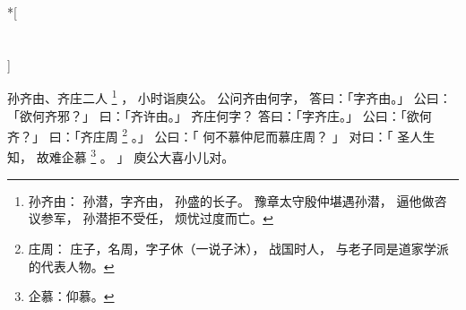 
\switchcolumn[0]*[\section{}]

孙齐由、齐庄二人%
\footnote{%
    孙齐由：
        孙潜，字齐由，
        孙盛的长子。
        豫章太守殷仲堪遇孙潜，
        逼他做咨议参军，
        孙潜拒不受任，
        烦忧过度而亡。
}%
，
小时诣庾公。
公问齐由何字，
答曰：「字齐由。」
公曰：「欲何齐邪？」
曰：「齐许由。」
齐庄何字？
答曰：「字齐庄。」
公曰：「欲何齐？」
曰：「齐庄周%
\footnote{%
    庄周：
        庄子，名周，字子休（一说子沐），
        战国时人，
        与老子同是道家学派的代表人物。
}%
。」
公曰：「
    何不慕仲尼而慕庄周？
」
对曰：「
    圣人生知，
    故难企慕%
    \footnote{%
        企慕：仰慕。
    }%
    。
」
庾公大喜小儿对。

\switchcolumn


